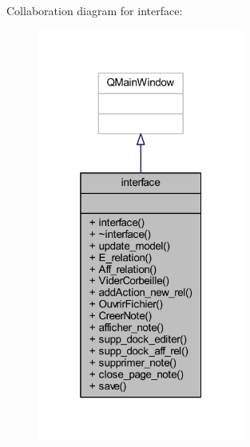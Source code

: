Collaboration diagram for interface\+:
\nopagebreak
\begin{figure}[H]
\begin{center}
\leavevmode
\includegraphics[width=193pt]{classinterface__coll__graph}
\end{center}
\end{figure}
